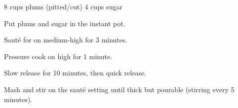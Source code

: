 \dishtype{\preserve}
\dishother{\vegetarian}
\begin{ingreds}
    8 cups plums (pitted/cut)
    4 cups sugar
\end{ingreds}
\begin{method}
    Put plums and sugar in the instant pot.\par
    Saut\'e for on medium-high for 3 minutes.\par
    Pressure cook on high for 1 minute.\par
    Slow release for 10 minutes, then quick release.\par
    Mash and stir on the saut\'e setting until thick but pourable (stirring every 5 minutes).
\end{method}
